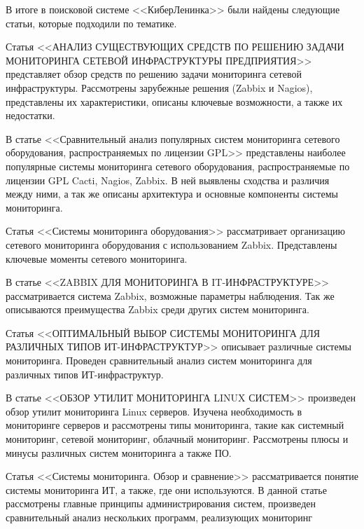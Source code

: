 В итоге в поисковой системе <<КиберЛенинка>> были найдены следующие статьи, которые подходили по тематике.

Статья <<АНАЛИЗ СУЩЕСТВУЮЩИХ СРЕДСТВ ПО РЕШЕНИЮ ЗАДАЧИ МОНИТОРИНГА СЕТЕВОЙ ИНФРАСТРУКТУРЫ ПРЕДПРИЯТИЯ>> \cite{instrumentmonitoring}
представляет обзор средств по решению задачи мониторинга сетевой инфраструктуры. 
Рассмотрены зарубежные решения (Zabbix и Nagios), представлены их характеристики, описаны ключевые возможности, а также их недостатки. 

В статье <<Сравнительный анализ популярных систем мониторинга сетевого оборудования, распространяемых по лицензии GPL>> 
\cite{sravnitelnyy-analiz-populyarnyh-sistem-monitoringa-setevogo-oborudovaniya-rasprostranyaemyh-po-litsenzii-gpl}
представлены наиболее популярные системы мониторинга сетевого оборудования, распространяемые по лицензии GPL Cacti, Nagios, Zabbix. 
В ней выявлены сходства и различия между ними, а так же описаны архитектура и основные компоненты системы мониторинга.

Статья <<Системы мониторинга оборудования>> \cite{sistemy-monitoringa-oborudovaniya}
рассматривает организацию сетевого мониторинга оборудования с использованием Zabbix. 
Представлены ключевые моменты сетевого мониторинга.

В статье <<ZABBIX ДЛЯ МОНИТОРИНГА В IT-ИНФРАСТРУКТУРЕ>> 
\cite{zabbix-dlya-monitoringa-v-it-infrastrukture}
рассматривается система Zabbix, возможные параметры наблюдения. Так же описываются преимущества Zabbix среди других систем мониторинга.

Статья <<ОПТИМАЛЬНЫЙ ВЫБОР СИСТЕМЫ МОНИТОРИНГА ДЛЯ РАЗЛИЧНЫХ ТИПОВ ИТ-ИНФРАСТРУКТУР>>
\cite{optimalnyy-vybor-sistemy-monitoringa-dlya-razlichnyh-tipov-it-infrastruktur}
описывает различные системы мониторинга. Проведен сравнительный анализ систем мониторинга для различных типов ИТ-инфраструктур.

В статье <<ОБЗОР УТИЛИТ МОНИТОРИНГА LINUX СИСТЕМ>> \cite{obzor-utilit-monitoringa-linux-sistem}
произведен обзор утилит мониторинга Linux серверов. 
Изучена необходимость в мониторинге серверов и рассмотрены типы мониторинга, такие как системный мониторинг, сетевой мониторинг, облачный мониторинг.
Рассмотрены плюсы и минусы различных систем мониторинга а также ПО.

Статья <<Системы мониторинга. Обзор и сравнение>> \cite{sistemy-monitoringa-obzor-i-sravnenie}
рассматривается понятие системы мониторинга ИТ, а также, где они используются. В данной статье рассмотрены главные принципы администрирования систем,
произведен сравнительный анализ нескольких программ, реализующих мониторинг

